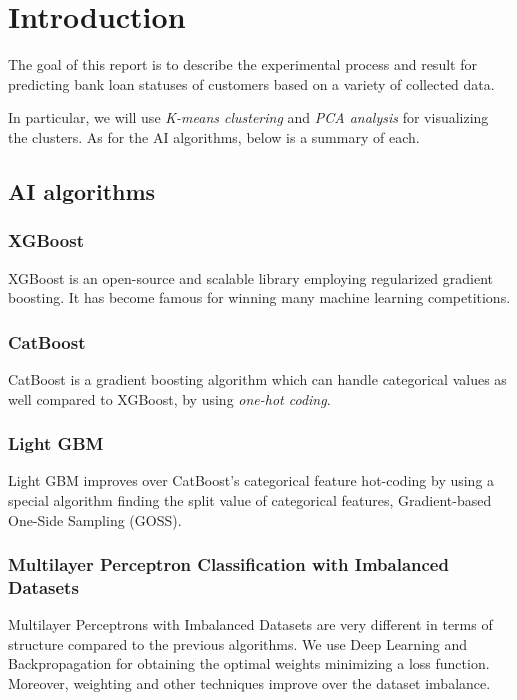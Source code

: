 \documentclass[12pt]{article}
\begin{document}


\section{Introduction}


The goal of this report is to describe the experimental process and result for predicting bank loan statuses of customers based on a variety of collected data. 

In particular, we will use \textit{K-means clustering} and \textit{PCA analysis} for visualizing the clusters. As for the AI algorithms, below is a summary of each.

\subsection{AI algorithms}
\subsubsection{XGBoost}
XGBoost \cite{chen2016xgboost} is an open-source and scalable library employing regularized gradient boosting. It has become famous for winning many machine learning competitions.

\subsubsection{CatBoost}
CatBoost \cite{dorogush2018catboost} is a gradient boosting algorithm which can handle categorical values as well compared to XGBoost, by using \textit{one-hot coding}.

\subsubsection{Light GBM}
Light GBM \cite{ke2017lightgbm} improves over CatBoost's categorical feature hot-coding by using a special algorithm finding the split value of categorical features, Gradient-based One-Side Sampling (GOSS).

\subsubsection{Multilayer Perceptron Classification with Imbalanced Datasets}
Multilayer Perceptrons with Imbalanced Datasets \cite{he2009learning} are very different in terms of structure compared to the previous algorithms. We use Deep Learning and Backpropagation for obtaining the optimal weights minimizing a loss function. Moreover, weighting and other techniques improve over the dataset imbalance. 
\end{document}
